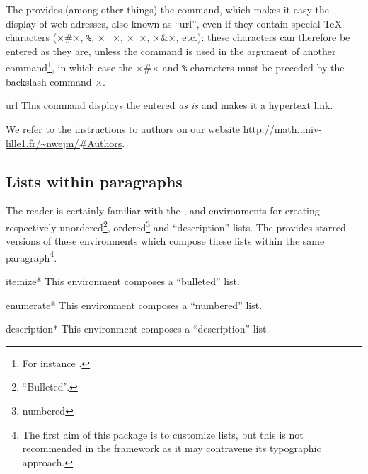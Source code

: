 \documentclass[english,nolocaltoc]{nwejmart}
\newtheorem[style=definition]{fact}
\newtheorem[title-plural=Criteria]{criterion}
\newtheorem[title=random experiment]{rexp}
\begin{document}
The  provides (among other things) the 
command, which makes it easy the display of web adresses, also known
as \enquote{\gls{url}}, even if they contain special \TeX{} characters (×#×,
%
\lstinline[commentstyle={}]+%+,
%
×_×, ×~×, ×&×, etc.): these characters can therefore be entered as
they are, unless the   command is used in the argument of
another command\footnote{For instance
  \protect{}.}, in which case the ×#× and
%
\lstinline[commentstyle={}]+%+
%
characters must be preceded by the backslash command ×\×.

\begin{docCommand}{url}{}
  This command displays  the  entered  \emph{as is}
  and makes it a hypertext link.
\begin{bodycode}[listing and text,listing options={alsolanguage={[hyperref]TeX},deletekeywords={[2]url}}]
We refer to the instructions to authors on our website
\url{http://math.univ-lille1.fr/~nwejm/#Authors}.
\end{bodycode}
\end{docCommand}

\subsection{Lists  within paragraphs}
\label{sec:listes-en-ligne}

The reader is certainly familiar with the ,  and
 environments for creating respectively
unordered\footnote{\enquote{Bulleted}.}, ordered\footnote{\Ie*{}
  numbered} and \enquote{description} lists. The 
provides starred versions of these environments which compose these
lists within the same paragraph\footnote{The first aim of this package
  is to customize lists, but this is not recommended in the \nwejm{}
  framework as it may contravene its typographic approach.}.

\begin{docEnvironment}[doclang/environment content=list]{itemize*}{}
  This environment composes a \enquote{bulleted} list.
\end{docEnvironment}
\begin{docEnvironment}[doclang/environment content=list]{enumerate*}{}
   This environment composes a \enquote{numbered} list. 
\end{docEnvironment}
\begin{docEnvironment}[doclang/environment content=list]{description*}{}
   This environment composes a \enquote{description} list.
\end{docEnvironment}
\end{document}
